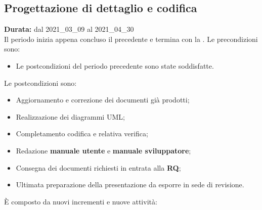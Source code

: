 \subsection{Progettazione di dettaglio e codifica}
\label{progettazione_di_dettaglio}
\textbf{Durata:} dal 2021\_03\_09 al 2021\_04\_30 \\
Il periodo inizia appena concluso il precedente e termina con la .
Le precondizioni sono:
\begin{itemize}
    \item Le postcondizioni del periodo precedente sono state soddisfatte.
\end{itemize}
Le postcondizioni sono:
\begin{itemize}
    \item Aggiornamento e correzione dei documenti già prodotti;
    \item Realizzazione dei diagrammi UML;
    \item Completamento codifica e relativa verifica;
    \item Redazione \textbf{manuale utente} e \textbf{manuale sviluppatore};
    \item Consegna dei documenti richiesti in entrata alla \textbf{RQ};
    \item Ultimata preparazione della presentazione da esporre in sede di revisione.
\end{itemize}
È composto da nuovi incrementi e nuove attività:
